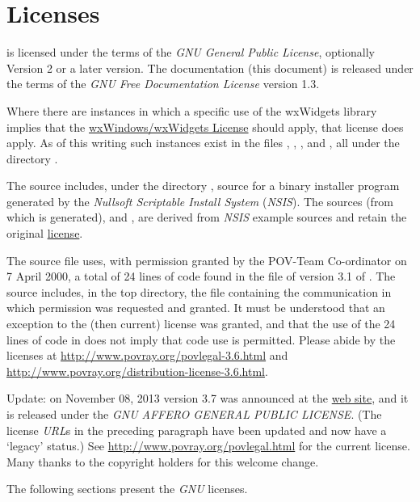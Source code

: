 \chapter{Licenses}%
\label{chap:licenses}

	\IXpkgu{} is licensed under the terms of the \emph{GNU
	General Public License}, optionally Version 2 or a later version.
	The \IXpkg{} documentation (this document) is released under
	the terms of the
	\emph{GNU Free Documentation License} version 1.3.

	Where there are instances in which a specific use of the
	wxWidgets library implies that the
	\href{http://www.wxwidgets.org/about/newlicen.htm}{wxWindows/wxWidgets License}
	should apply, that license does apply.
	As of this writing such instances exist in the files
	, ,
	, and ,
	all under the directory .

	The \IXpkg{} source includes, under the directory
	, source for a binary installer program
	generated by the
	\emph{Nullsoft Scriptable Install System} (\emph{NSIS}). The
	sources  (from which
	 is generated), and
	,
	are derived from \emph{NSIS} example sources and
	retain the original
	\href{http://nsis.sourceforge.net/License}{license}.
	
	The source file  uses,
	with permission granted
	by the POV-Team Co-ordinator on 7 April 2000,
	a total of 24 lines of code found in
	the file  of version 3.1 of \IXpov{}.
	The \IXpkg{} source includes, in the  top
	directory, the file
	 containing the communication
	in which permission was requested and granted. It must be
	understood that an exception to the (then current) license
	was granted, and that the use of the 24 lines of code in
	\IXpkg{} does not imply that \IXpov{} code use is
	permitted. Please abide by the \IXpov{} licenses at
	\url{http://www.povray.org/povlegal-3.6.html} and
	\url{http://www.povray.org/distribution-license-3.6.html}.
	
	Update: on November 08, 2013 \IXpov{} version 3.7 was
	announced at the
	\href{http://www.povray.org/}{\IXpov{} web site}, and
	it is released under the
	\emph{GNU AFFERO GENERAL PUBLIC LICENSE}.
	(The license \emph{URL}s in the preceding paragraph have been
	updated and now have a `legacy' status.)
	See \url{http://www.povray.org/povlegal.html} for the
	current license. Many thanks to the \IXpov{} copyright
	holders for this welcome change.

	The following sections present the \emph{GNU} licenses.

